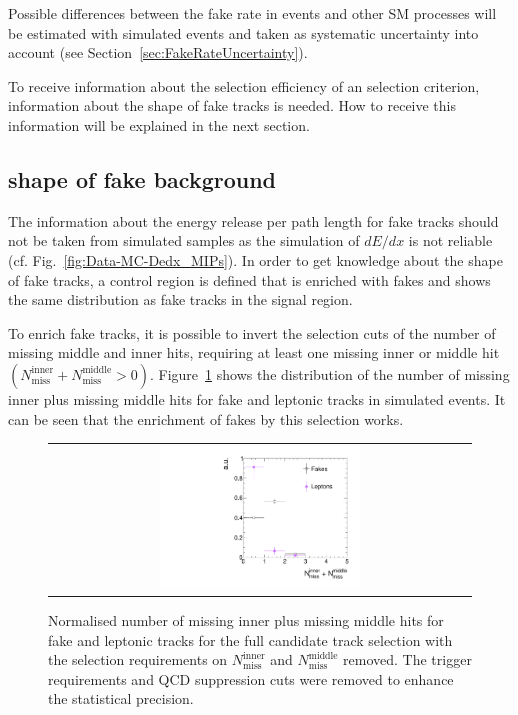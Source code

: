 Possible differences between the fake rate in \Zlep events and other SM processes will be estimated with simulated events and taken as systematic uncertainty into account (see Section~\ref{sec:FakeRateUncertainty}).

To receive information about the selection efficiency of an \ias selection criterion, information about the \ias shape of fake tracks is needed.
How to receive this information will be explained in the next section.

\subsection*{\ias shape of fake background}
The information about the energy release per path length for fake tracks should not be taken from simulated samples as the simulation of $dE/dx$ is not reliable (cf. Fig.~\ref{fig:Data-MC-Dedx_MIPs}).
In order to get knowledge about the \ias shape of fake tracks, a control region \fakeCR is defined that is enriched with fakes and shows the same \ias distribution as fake tracks in the signal region.

To enrich fake tracks, it is possible to invert the selection cuts of the number of missing middle and inner hits, \ie requiring at least one missing inner or middle hit $\left( N_{\text{miss}}^{\text{inner}} +N_{\text{miss}}^{\text{middle}}>0\right)$.
Figure~\ref{fig:NMissInnerAndMiddle} shows the distribution of the number of missing inner plus missing middle hits for fake and leptonic tracks in simulated \WJets events.
It can be seen that the enrichment of fakes by this selection works. 
\begin{figure}[!b]
  \centering 
  \begin{tabular}{c}
    \includegraphics[width=0.49\textwidth]{figures/analysis/Background/NLostInnerPlusMiddleForAllBkg_chiTracksQCDsupressionTrigger.pdf}
  \end{tabular}
  \caption{Normalised number of missing inner plus missing middle hits for fake and leptonic tracks for the full candidate track selection with the selection requirements on $N_{\text{miss}}^{\text{inner}}$ and $N_{\text{miss}}^{\text{middle}}$ removed. The trigger requirements and QCD suppression cuts were removed to enhance the statistical precision.}
  \label{fig:NMissInnerAndMiddle}
\end{figure}

